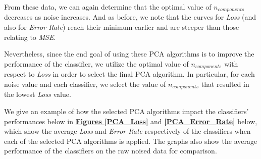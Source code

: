 \documentclass[12pt]{article}
\begin{document}
From these data, we can again determine that the optimal value of $n_{components}$ decreases as noise increases. And as before, we note that the curves for \textit{Loss} (and also for \textit{Error Rate}) reach their minimum earlier and are steeper than those relating to \textit{MSE}.

Nevertheless, since the end goal of using these PCA algorithms is to improve the performance of the classifier, we utilize the optimal value of $n_{components}$ with respect to \textit{Loss} in order to select the final PCA algorithm. In particular, for each noise value and each classifier, we select the value of $n_{components}$ that resulted in the lowest \textit{Loss} value.

We give an example of how the selected PCA algorithms impact the classifiers' performances below in \textbf{\hyperref[PCA_Loss]{Figures \ref*{PCA_Loss}}} and \textbf{\hyperref[PCA_Error_Rate]{\ref*{PCA_Error_Rate}}} below, which show the average \textit{Loss} and \textit{Error Rate} respectively of the classifiers when each of the selected PCA algorithms is applied. The graphs also show the average performance of the classifiers on the raw noised data for comparison.
\end{document}
